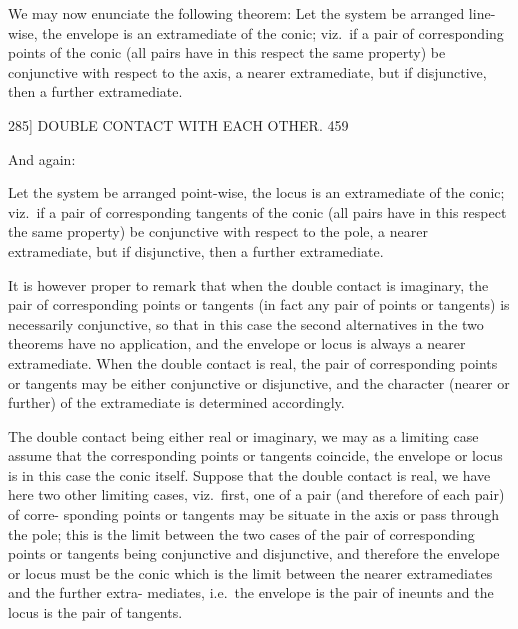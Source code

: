 \documentclass[11pt]{article}
\begin{document}
\smallskip

We may now enunciate the following theorem: Let the system be arranged line-
wise, the envelope is an extramediate of the conic; viz.\ if a pair of corresponding
points of the conic (all pairs have in this respect the same property) be conjunctive
with respect to the axis, a nearer extramediate, but if disjunctive, then a further
extramediate.

\begin{center}
\textsc{285]} \hfill DOUBLE CONTACT WITH EACH OTHER. \hfill 459
\end{center}

And again:

\smallskip

Let the system be arranged point-wise, the locus is an extramediate of the conic;
viz.\ if a pair of corresponding tangents of the conic (all pairs have in this respect the
same property) be conjunctive with respect to the pole, a nearer extramediate, but if
disjunctive, then a further extramediate.

\smallskip

It is however proper to remark that when the double contact is imaginary, the
pair of corresponding points or tangents (in fact any pair of points or tangents) is
necessarily conjunctive, so that in this case the second alternatives in the two theorems
have no application, and the envelope or locus is always a nearer extramediate. When
the double contact is real, the pair of corresponding points or tangents may be either
conjunctive or disjunctive, and the character (nearer or further) of the extramediate is
determined accordingly.

\smallskip

The double contact being either real or imaginary, we may as a limiting case
assume that the corresponding points or tangents coincide, the envelope or locus is in
this case the conic itself. Suppose that the double contact is real, we have here two
other limiting cases, viz.\ first, one of a pair (and therefore of each pair) of corre-
sponding points or tangents may be situate in the axis or pass through the pole;
this is the limit between the two cases of the pair of corresponding points or tangents
being conjunctive and disjunctive, and therefore the envelope or locus must be the
conic which is the limit between the nearer extramediates and the further extra-
mediates, i.e.\ the envelope is the pair of ineunts and the locus is the pair of tangents.
\end{document}
